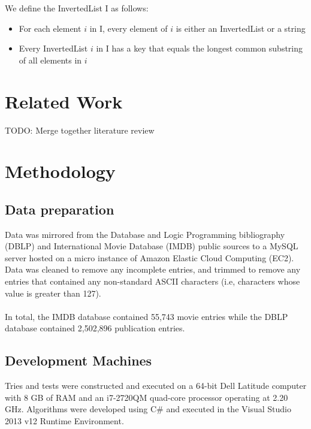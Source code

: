 \documentclass[pdftex,12pt,letter]{article}
\begin{document}
We define the InvertedList I as follows:

\begin{itemize}
\item For each element $i$ in I, every element of $i$ is either an InvertedList or a string
\item Every InvertedList $i$ in I has a key that equals the longest common substring of all elements in $i$
\end{itemize}

\section{Related Work}
TODO: Merge together literature review

\section{Methodology}
\subsection{Data preparation}
Data was mirrored from the Database and Logic Programming bibliography (DBLP) and International Movie Database (IMDB) public sources to a MySQL server hosted on a micro instance of Amazon Elastic Cloud Computing (EC2). Data was cleaned to remove any incomplete entries, and trimmed to remove any entries that contained any non-standard ASCII characters (i.e, characters whose value is greater than 127).\\
\\
In total, the IMDB database contained 55,743 movie entries while the DBLP database contained 2,502,896 publication entries.


\subsection{Development Machines}
Tries and tests were constructed and executed on a 64-bit Dell Latitude computer with 8 GB of RAM and an i7-2720QM quad-core processor operating at 2.20 GHz. Algorithms were developed using C\# and executed in the Visual Studio 2013 v12 Runtime Environment. 
\end{document}
